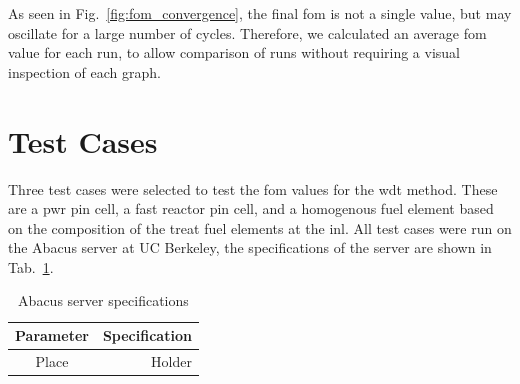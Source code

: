 As seen in Fig.~\ref{fig:fom_convergence}, the final \gls{fom} is not
a single value, but may oscillate for a large number of
cycles. Therefore, we calculated an average \gls{fom} value for each
run, to allow comparison of runs without requiring a visual inspection
of each graph.

\section{Test Cases}
\label{sec:test_cases}

Three test cases were selected to test the \gls{fom} values for the
\gls{wdt} method. These are a \gls{pwr} pin cell, a fast reactor pin
cell, and a homogenous fuel element based on the composition of the
\gls{treat} fuel elements at the \gls{inl}. All test cases were run on
the Abacus server at UC Berkeley, the specifications of the server are
shown in Tab.~\ref{tab:abacus}.

\begin{table}[hbtp]
  \centering
  \begin{tabular}{cr}
    \toprule
    \textrm{Parameter} & \textrm{Specification} \\ \midrule
    Place & Holder
          \\ \bottomrule
  \end{tabular}
  \caption{Abacus server specifications}
  \label{tab:abacus}
\end{table}

